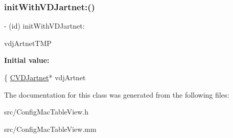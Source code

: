 \subsubsection{\texorpdfstring{init\+With\+V\+D\+Jartnet\+:()}{initWithVDJartnet:()}}
{\footnotesize\ttfamily -\/ (id) init\+With\+V\+D\+Jartnet\+: \begin{DoxyParamCaption}\item[{(\hyperlink{classCVDJartnet}{C\+V\+D\+Jartnet}$\ast$)}]{vdj\+Artnet\+T\+MP }\end{DoxyParamCaption}}

{\bfseries Initial value\+:}
\begin{DoxyCode}
\{
    \hyperlink{classCVDJartnet}{CVDJartnet}* vdjArtnet
\end{DoxyCode}


The documentation for this class was generated from the following files\+:\begin{DoxyCompactItemize}
\item 
src/Config\+Mac\+Table\+View.\+h\item 
src/Config\+Mac\+Table\+View.\+mm\end{DoxyCompactItemize}
